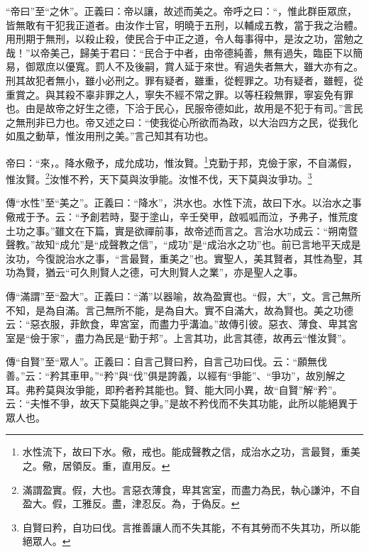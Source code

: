 {\noindent\shu{}\fzkt “帝曰”至“之休”。正義曰：帝以讓，故述而美之。帝呼之曰：“，惟此群臣眾庶，皆無敢有干犯我正道者。由汝作士官，明曉于五刑，以輔成五教，當于我之治體。用刑期于無刑，以殺止殺，使民合于中正之道，令人每事得中，是汝之功，當勉之哉！”以帝美己，歸美于君曰：“民合于中者，由帝德純善，無有過失，臨臣下以簡易，御眾庶以優寬。罰人不及後嗣，賞人延于來世。宥過失者無大，雖大亦有之。刑其故犯者無小，雖小必刑之。罪有疑者，雖重，從輕罪之。功有疑者，雖輕，從重賞之。與其殺不辜非罪之人，寧失不經不常之罪。以等枉殺無罪，寧妄免有罪也。由是故帝之好生之德，下洽于民心，民服帝德如此，故用是不犯于有司。”言民之無刑非已力也。帝又述之曰：“使我從心所欲而為政，以大治四方之民，從我化如風之動草，惟汝用刑之美。”言己知其有功也。 \par}

帝曰：“來，。降水儆予，成允成功，惟汝賢。\footnote{水性流下，故曰下水。儆，戒也。能成聲教之信，成治水之功，言最賢，重美之。儆，居領反。重，直用反。}克勤于邦，克儉于家，不自滿假，惟汝賢。\footnote{滿謂盈實。假，大也。言惡衣薄食，卑其宮室，而盡力為民，執心謙沖，不自盈大。假，工雅反。盡，津忍反。為，于偽反。}汝惟不矜，天下莫與汝爭能。汝惟不伐，天下莫與汝爭功。\footnote{自賢曰矜，自功曰伐。言推善讓人而不失其能，不有其勞而不失其功，所以能絕眾人。}

{\noindent\zhuan{}\fzbyks 傳“水性”至“美之”。正義曰：“降水”，洪水也。水性下流，故曰下水。以治水之事儆戒于予。云：“予創若時，娶于塗山，辛壬癸甲，啟呱呱而泣，予弗子，惟荒度土功之事。”雖文在下篇，實是欲禪前事，故帝述而言之。言治水功成云：“朔南暨聲教。”故知“成允”是“成聲教之信”，“成功”是“成治水之功”也。前已言地平天成是汝功，今復說治水之事，“言最賢，重美之”也。實聖人，美其賢者，其性為聖，其功為賢，猶云“可久則賢人之德，可大則賢人之業”，亦是聖人之事。 \par}

{\noindent\zhuan{}\fzbyks 傳“滿謂”至“盈大”。正義曰：“滿”以器喻，故為盈實也。“假，大”，文。言己無所不知，是為自滿。言己無所不能，是為自大。實不自滿大，故為賢也。美之功德云：“惡衣服，菲飲食，卑宮室，而盡力乎溝洫。”故傳引彼。惡衣、薄食、卑其宮室是“儉于家”，盡力為民是“勤于邦”。上言其功，此言其德，故再云“惟汝賢”。 \par}

{\noindent\zhuan{}\fzbyks 傳“自賢”至“眾人”。正義曰：自言己賢曰矜，自言己功曰伐。云：“願無伐善。”云：“矜其車甲。”“矜”與“伐”俱是誇義，以經有“爭能”、“爭功”，故別解之耳。弗矜莫與汝爭能，即矜者矜其能也。賢、能大同小異，故“自賢”解“矜”。云：“夫惟不爭，故天下莫能與之爭。”是故不矜伐而不失其功能，此所以能絕異于眾人也。 \par}

